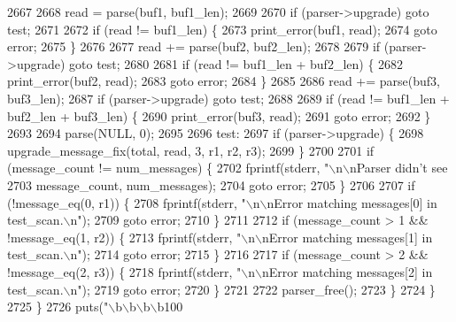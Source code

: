 \begin{DoxyCode}
{2667 
2668         read = parse(buf1, buf1\_len);
2669 
2670         \textcolor{keywordflow}{if} (parser->upgrade) \textcolor{keywordflow}{goto} test;
2671 
2672         \textcolor{keywordflow}{if} (read != buf1\_len) \{
2673           print_error(buf1, read);
2674           \textcolor{keywordflow}{goto} error;
2675         \}
2676 
2677         read += parse(buf2, buf2\_len);
2678 
2679         \textcolor{keywordflow}{if} (parser->upgrade) \textcolor{keywordflow}{goto} test;
2680 
2681         \textcolor{keywordflow}{if} (read != buf1\_len + buf2\_len) \{
2682           print_error(buf2, read);
2683           \textcolor{keywordflow}{goto} error;
2684         \}
2685 
2686         read += parse(buf3, buf3\_len);
2687         \textcolor{keywordflow}{if} (parser->upgrade) \textcolor{keywordflow}{goto} test;
2688 
2689         \textcolor{keywordflow}{if} (read != buf1\_len + buf2\_len + buf3\_len) \{
2690           print_error(buf3, read);
2691           \textcolor{keywordflow}{goto} error;
2692         \}
2693 
2694         parse(NULL, 0);
2695 
2696 test:
2697         \textcolor{keywordflow}{if} (parser->upgrade) \{
2698           upgrade_message_fix(total, read, 3, r1, r2, r3);
2699         \}
2700 
2701         \textcolor{keywordflow}{if} (message\_count != num_messages) \{
2702           fprintf(stderr, \textcolor{stringliteral}{"\(\backslash\)n\(\backslash\)nParser didn't see %
2703             message\_count, num_messages);
2704           \textcolor{keywordflow}{goto} error;
2705         \}
2706 
2707         \textcolor{keywordflow}{if} (!message_eq(0, r1)) \{
2708           fprintf(stderr, \textcolor{stringliteral}{"\(\backslash\)n\(\backslash\)nError matching messages[0] in test\_scan.\(\backslash\)n"});
2709           \textcolor{keywordflow}{goto} error;
2710         \}
2711 
2712         \textcolor{keywordflow}{if} (message\_count > 1 && !message_eq(1, r2)) \{
2713           fprintf(stderr, \textcolor{stringliteral}{"\(\backslash\)n\(\backslash\)nError matching messages[1] in test\_scan.\(\backslash\)n"});
2714           \textcolor{keywordflow}{goto} error;
2715         \}
2716 
2717         \textcolor{keywordflow}{if} (message\_count > 2 && !message_eq(2, r3)) \{
2718           fprintf(stderr, \textcolor{stringliteral}{"\(\backslash\)n\(\backslash\)nError matching messages[2] in test\_scan.\(\backslash\)n"});
2719           \textcolor{keywordflow}{goto} error;
2720         \}
2721 
2722         parser_free();
2723       \}
2724     \}
2725   \}
2726   puts(\textcolor{stringliteral}{"\(\backslash\)b\(\backslash\)b\(\backslash\)b\(\backslash\)b100%
}}}
\end{DoxyCode}
